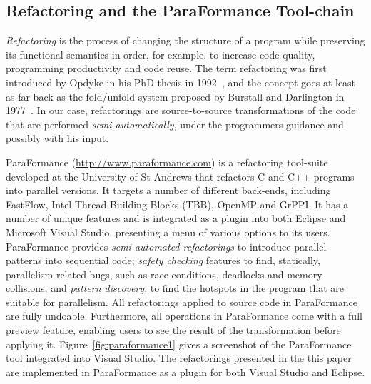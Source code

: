 
\subsection{Refactoring and the ParaFormance Tool-chain}

\noindent
\emph{Refactoring} is the process of changing the structure of a program while preserving
its functional semantics in order, for example, to increase code quality, programming
productivity and code reuse. The term refactoring was first introduced by Opdyke in his PhD thesis in 1992~\cite{opdyke}, and the concept goes at least as far back as the fold/unfold system proposed by Burstall and Darlington in 1977~\cite{darlington77}. In our case, refactorings are source-to-source transformations of the code that are performed \emph{semi-automatically}, under the programmers guidance and possibly with his input. 

%
%
%

ParaFormance (\url{http://www.paraformance.com}) is a refactoring tool-suite developed at the University of St Andrews that refactors C and C++ programs into parallel versions. It targets a number of different back-ends, including FastFlow, Intel Thread Building Blocks (TBB), OpenMP and GrPPI. It has a number of unique features and is integrated as a plugin into both Eclipse and Microsoft Visual Studio, presenting a menu of various options to its users. ParaFormance provides \emph{semi-automated refactorings} to introduce parallel patterns into sequential code; \emph{safety checking} features to find, statically, parallelism related bugs, such as race-conditions, deadlocks and memory collisions; and \emph{pattern discovery}, to find the hotspots in the program that are suitable for parallelism. All refactorings applied to source code in ParaFormance are fully undoable. Furthermore, all operations in ParaFormance come with a full preview feature, enabling users to see the result of the transformation before applying it. Figure~\ref{fig:paraformance1} gives a screenshot of the ParaFormance tool integrated into Visual Studio. The refactorings presented in the this paper are implemented in ParaFormance as a plugin for both Visual Studio and Eclipse.

